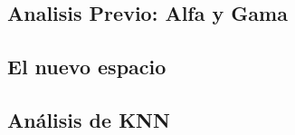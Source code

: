 \subsection{Analisis Previo: Alfa y Gama}


\newpage
\subsection{El nuevo espacio}


\newpage
\subsection{Análisis de KNN}

